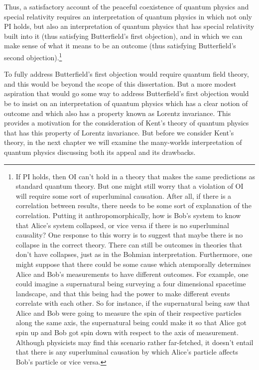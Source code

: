 Thus, a satisfactory account of the peaceful coexistence of quantum physics and special relativity requires an interpretation of quantum physics in which not only PI holds, but also an interpretation of quantum physics that has special relativity built into it (thus satisfying Butterfield's first objection), and in which we can make sense of what it means to be an outcome (thus satisfying Butterfield's second objection).\footnote{If PI holds, then OI can't hold in a theory that makes the same predictions as standard quantum theory. But one might still worry that  a violation of OI will require some sort of superluminal causation. After all, if there is a correlation between results, there needs to be some sort of explanation of the correlation. Putting it anthropomorphically, how is Bob's system to know that Alice's system collapsed, or vice versa if there is no superluminal causality? One response to this worry is to suggest that maybe there is no collapse in the correct theory. There can still be outcomes in theories that don't have collapses, just as in the Bohmian interpretation. Furthermore, one might suppose that there could be some cause which atemporally determines Alice and Bob's measurements to have different outcomes. For example, one could imagine a supernatural being surveying a four dimensional spacetime landscape, and that this being had the power to make different events correlate with each other. So for instance, if the supernatural being saw that Alice and Bob were going to measure the spin of their respective particles along the same axis, the supernatural being could make it so that Alice got spin up and Bob got spin down with respect to the axis of measurement. Although physicists may find this scenario rather far-fetched, it doesn't entail that there is any superluminal causation by which Alice's particle affects Bob's particle or vice versa.} 

To fully address Butterfield's first objection would require quantum field theory, and this would be beyond the scope of this dissertation. But a more modest aspiration that would go some way to address Butterfield's first objection would be to insist on an interpretation of quantum physics which has a clear notion of outcome and which also has a property known as Lorentz invariance. This provides a motivation for the consideration of Kent's theory of quantum physics that has this property of Lorentz invariance. But before we consider Kent's theory, in the next chapter we will examine the many-worlds interpretation of quantum physics discussing both its appeal and its drawbacks.
